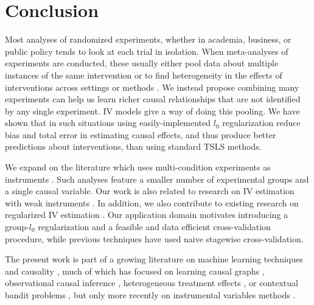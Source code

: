 \documentclass{article}
\begin{document}
\section{Conclusion}
Most analyses of randomized experiments, whether in academia, business, or public policy tends to look at each trial in isolation. When meta-analyses of experiments are conducted, these usually either pool data about multiple instances of the same intervention or to find heterogeneity in the effects of interventions across settings or methods \citep[e.g.,][]{hemkens2016agreement}. We instead propose combining many experiments can help us learn richer causal relationships that are not identified by any single experiment. IV models give a way of doing this pooling. We have shown that in such situations using easily-implemented $l_0$ regularization reduce bias and total error in estimating causal effects, and thus produce better predictions about interventions, than using standard TSLS methods. 

We expand on the literature which uses multi-condition experiments as instruments \citep{eckles2016estimating, goldman2014experiments}. Such analyses feature a smaller number of experimental groups and a single causal variable. Our work is also related to research on IV estimation with weak instruments \citep{stock2012survey, staiger1997instrumental, stock2005testing}. In addition, we also contribute to existing research on regularized IV estimation \citep{belloni2012sparse, hansen2014instrumental, chamberlain2004random}.
Our application domain motivates introducing a group-$l_0$ regularization and a feasible and data efficient cross-validation procedure, while previous techniques have used naive stagewise cross-validation.

The present work is part of a growing literature on machine learning techniques and causality \citep{bottou2014machine}, much of which has focused on learning causal graphs \citep{pearl2009causality}, observational causal inference \citep{shalit2016bounding}, heterogeneous treatment effects \citep{grimmer2014estimating, athey2016recursive, peysakhovich2016combining}, or contextual bandit problems \citep{agarwal2014taming, dudik2014doubly,swaminathan2015counterfactual}, but only more recently on instrumental variables methods \citep{hartford2016deepiv,peters2016causal}.
\end{document}
